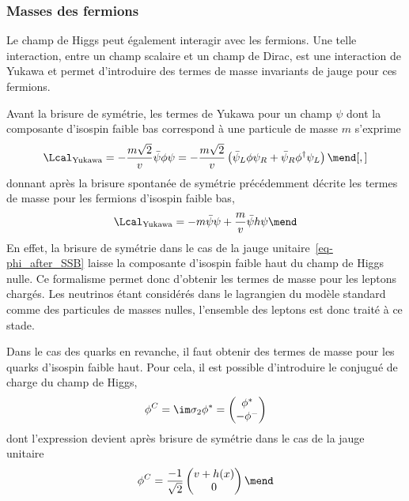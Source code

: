 \subsubsection{Masses des fermions}\label{chapter-MS-MSSM-section-formalisme-subsec-Higgs_mechanism-subsubsec-fermions}
Le champ de Higgs peut également interagir avec les fermions. Une telle interaction, entre un champ scalaire et un champ de Dirac, est une interaction de Yukawa et permet d'introduire des termes de masse invariants de jauge pour ces fermions.
\par Avant la brisure de symétrie, les termes de Yukawa pour un champ $\psi$ dont la composante d'isospin faible bas correspond à une particule de masse $m$ s'exprime
\begin{equation}
\Lcal_\text{Yukawa}
= - \frac{m\sqrt{2}}{v} \bar{\psi} \phi \psi
= - \frac{m\sqrt{2}}{v} \left( \bar{\psi}_L \phi \psi_R + \bar{\psi}_R \phi^\dagger \psi_L \right)
\mend[,]
\end{equation}
donnant après la brisure spontanée de symétrie précédemment décrite les termes de masse pour les fermions d'isospin faible bas,
\begin{equation}
\Lcal_\text{Yukawa} = - m \bar{\psi}\psi + \frac{m}{v} \bar{\psi} h \psi
\mend
\end{equation}
En effet, la brisure de symétrie dans le cas de la jauge unitaire~\eqref{eq-phi_after_SSB} laisse la composante d'isospin faible haut du champ de Higgs nulle.
Ce formalisme permet donc d'obtenir les termes de masse pour les leptons chargés. Les neutrinos étant considérés dans le lagrangien du modèle standard comme des particules de masses nulles, l'ensemble des leptons est donc traité à ce stade.
\par Dans le cas des quarks en revanche, il faut obtenir des termes de masse pour les quarks d'isospin faible haut. Pour cela, il est possible d'introduire le conjugué de charge du champ de Higgs,
\begin{equation}
\phi^C = \im \sigma_2 \phi^* = \begin{pmatrix}
\phi^* \\ - \phi^-
\end{pmatrix}
\end{equation}
dont l'expression devient après brisure de symétrie dans le cas de la jauge unitaire
\begin{equation}
\phi^C =
\frac{-1}{\sqrt{2}}
\begin{pmatrix}
v+h(x)\\0
\end{pmatrix}
\mend
\end{equation}
